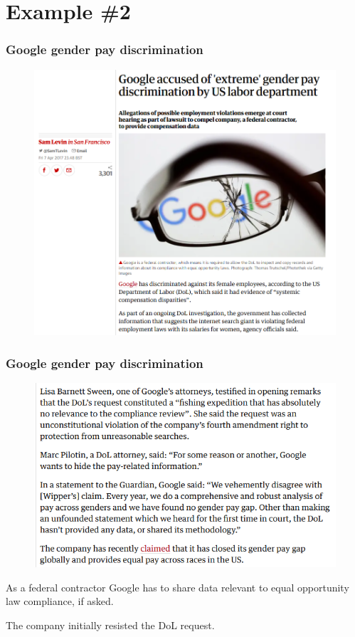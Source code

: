 \documentclass[12pt,english,dvipsnames,aspectratio=169,handout]{beamer}
\begin{document}
\section{Example \#2}

\begin{frame}
	\frametitle{Google gender pay discrimination}
	
	\begin{figure}
		\centering
		\includegraphics[scale=0.3]{../04-figures/04/04-01}
	\end{figure}
	
\end{frame}


\begin{frame}
	\frametitle{Google gender pay discrimination}
	
	\begin{figure}
		\centering
		\includegraphics[scale=0.4]{../04-figures/04/04-02}
	\end{figure}
	As a federal contractor Google has to share data relevant to equal opportunity law compliance, if asked.\bigskip
	
	The company initially resisted the DoL request.
\end{frame}
\end{document}
